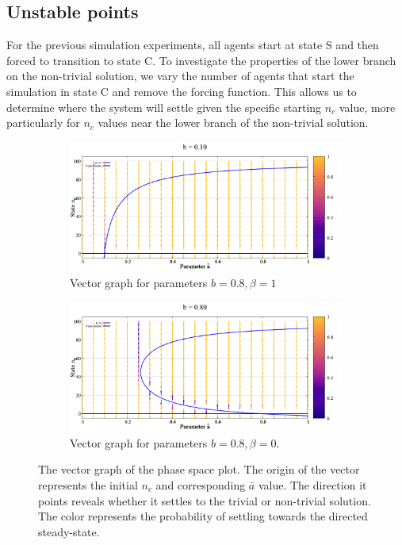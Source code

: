 \subsection{Unstable points}
For the previous simulation experiments, all agents start at state S and then forced to transition to state C. 
To investigate the properties of the lower branch on the non-trivial solution, we vary the number of agents that start the simulation in state C and remove the forcing function. 
This allows us to determine where the system will settle given the specific starting $n_{c}$ value, more particularly for $n_{c}$ values near the lower branch of the non-trivial solution. 

\begin{figure}
  \centering
  \begin{subfigure}[b]{\linewidth}
    \includegraphics[width=\linewidth]{images/chapter3/unstable2.png}
    \caption{Vector graph for parameters $b = 0.8, \beta = 1$}
  \end{subfigure}
  \begin{subfigure}[b]{\linewidth}
    \includegraphics[width=\linewidth]{images/chapter3/unstable.png}
    \caption{Vector graph for parameters $b = 0.8, \beta = 0$.}
  \end{subfigure}
  \caption{The vector graph of the phase space plot. The origin of the vector represents the initial $n_{c}$ and corresponding $\bar{a}$ value. The direction it points reveals whether it settles to the trivial or non-trivial solution. The color represents the probability of settling towards the directed steady-state.}
  \label{fig:compareSingleSS}
\end{figure}


